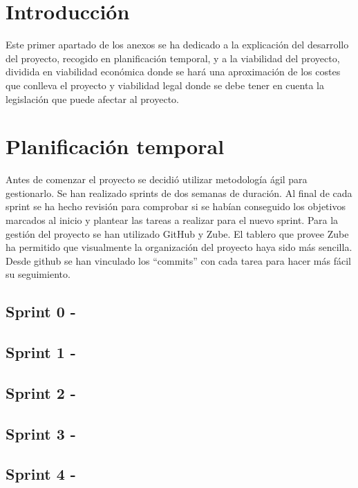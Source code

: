 
\section{Introducción}
Este primer apartado de los anexos se ha dedicado a la explicación del
desarrollo del proyecto, recogido en planificación temporal, y a la viabilidad
del proyecto, dividida en viabilidad económica donde se hará una aproximación de los costes que conlleva el proyecto y viabilidad legal donde se debe
tener en cuenta la legislación que puede afectar al proyecto.

\section{Planificación temporal}
Antes de comenzar el proyecto se decidió utilizar metodología ágil para
gestionarlo. Se han realizado sprints de dos semanas de duración.
Al final de cada sprint se ha hecho revisión para comprobar si se habían
conseguido los objetivos marcados al inicio y plantear las tareas a
realizar para el nuevo sprint.
Para la gestión del proyecto se han utilizado GitHub y Zube. El
tablero que provee Zube ha permitido que visualmente la organización
del proyecto haya sido más sencilla. Desde github se han vinculado los ``commits'' 
con cada tarea para hacer más fácil su seguimiento.

\subsection{Sprint 0 - }
\subsection{Sprint 1 - }
\subsection{Sprint 2 - }
\subsection{Sprint 3 - }
\subsection{Sprint 4 - }
